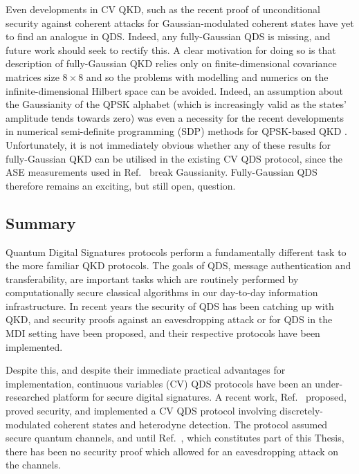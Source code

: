 Even developments in CV QKD, such as the recent proof of unconditional security against coherent attacks for Gaussian-modulated coherent states \cite{Leverrier2017} have yet to find an analogue in QDS. Indeed, any fully-Gaussian QDS is missing, and future work should seek to rectify this. A clear motivation for doing so is that description of fully-Gaussian QKD relies only on finite-dimensional covariance matrices size $8 \times 8$ \cite{Laudenbach2017} and so the problems with modelling and numerics on the infinite-dimensional Hilbert space can be avoided. Indeed, an assumption about the Gaussianity of the QPSK alphabet (which is increasingly valid as the states' amplitude tends towards zero) was even a necessity for the recent developments in numerical semi-definite programming (SDP) methods for QPSK-based QKD \cite{Lin2019, Ghorai2019}. Unfortunately, it is not immediately obvious whether any of these results for fully-Gaussian QKD can be utilised in the existing CV QDS protocol, since the ASE measurements used in Ref.~\cite{Croal2016} break Gaussianity. Fully-Gaussian QDS therefore remains an exciting, but still open, question.


\subsection{Summary}
Quantum Digital Signatures protocols perform a fundamentally different task to the more familiar QKD protocols. The goals of QDS, message authentication and transferability, are important tasks which are routinely performed by computationally secure classical algorithms in our day-to-day information infrastructure. In recent years the security of QDS has been catching up with QKD, and security proofs against an eavesdropping attack \cite{Amiri2016, Yin2016} or for QDS in the MDI setting \cite{Puthoor2016} have been proposed, and their respective protocols have been implemented. 

Despite this, and despite their immediate practical advantages for implementation, continuous variables (CV) QDS protocols have been an under-researched platform for secure digital signatures.  A recent work, Ref.~\cite{Croal2016} proposed, proved security, and implemented a CV QDS protocol involving discretely-modulated coherent states and heterodyne detection. The protocol assumed secure quantum channels, and until Ref.~\cite{Thornton2019}, which constitutes part of this Thesis, there has been no security proof which allowed for an eavesdropping attack on the channels.

